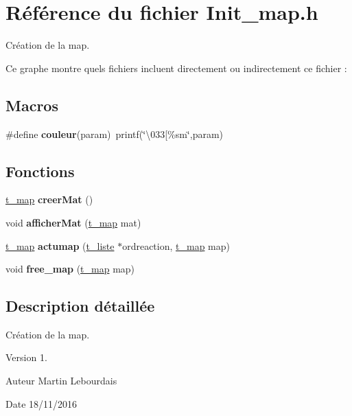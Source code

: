 \hypertarget{a00022}{}\section{Référence du fichier Init\+\_\+map.\+h}
\label{a00022}


Création de la map.  


Ce graphe montre quels fichiers incluent directement ou indirectement ce fichier \+:
\subsection*{Macros}
\begin{DoxyCompactItemize}
\item 
\#define {\bfseries couleur}(param)~printf(\char`\"{}\textbackslash{}033\mbox{[}\%sm\char`\"{},param)\hypertarget{a00022_aabcb2d6536b6c0ab41f99493c911489b}{}\label{a00022_aabcb2d6536b6c0ab41f99493c911489b}

\end{DoxyCompactItemize}
\subsection*{Fonctions}
\begin{DoxyCompactItemize}
\item 
\hyperlink{a00006}{t\+\_\+map} {\bfseries creer\+Mat} ()\hypertarget{a00022_aabb31eb0a9fed7b9013e4a396d92d8ae}{}\label{a00022_aabb31eb0a9fed7b9013e4a396d92d8ae}

\item 
void {\bfseries afficher\+Mat} (\hyperlink{a00006}{t\+\_\+map} mat)\hypertarget{a00022_a1280978369430f0c5e9696d4ef52517c}{}\label{a00022_a1280978369430f0c5e9696d4ef52517c}

\item 
\hyperlink{a00006}{t\+\_\+map} {\bfseries actumap} (\hyperlink{a00005}{t\+\_\+liste} $\ast$ordreaction, \hyperlink{a00006}{t\+\_\+map} map)\hypertarget{a00022_a3e1244b48997edd4275c613db97c6496}{}\label{a00022_a3e1244b48997edd4275c613db97c6496}

\item 
void {\bfseries free\+\_\+map} (\hyperlink{a00006}{t\+\_\+map} map)\hypertarget{a00022_a37963b5f2d2efb0fa80a11ac2999be5c}{}\label{a00022_a37963b5f2d2efb0fa80a11ac2999be5c}

\end{DoxyCompactItemize}


\subsection{Description détaillée}
Création de la map. 

\begin{DoxyVersion}{Version}
1. 
\end{DoxyVersion}
\begin{DoxyAuthor}{Auteur}
Martin Lebourdais 
\end{DoxyAuthor}
\begin{DoxyDate}{Date}
18/11/2016 
\end{DoxyDate}
